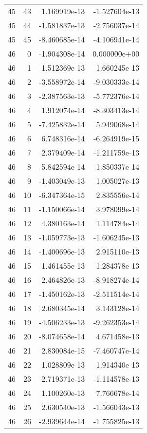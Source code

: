 \begin{tabular}{rrrr}
  45 &   43 &  1.169919e-13 & -1.527604e-13 \\
  45 &   44 & -1.581837e-13 & -2.756037e-14 \\
  45 &   45 & -8.460685e-14 & -4.106941e-14 \\
  46 &    0 & -1.904308e-14 &  0.000000e+00 \\
  46 &    1 &  1.512369e-13 &  1.660245e-13 \\
  46 &    2 & -3.558972e-14 & -9.030333e-14 \\
  46 &    3 & -2.387563e-13 & -5.772376e-14 \\
  46 &    4 &  1.912074e-14 & -8.303413e-14 \\
  46 &    5 & -7.425832e-14 &  5.949068e-14 \\
  46 &    6 &  6.748316e-14 & -6.264919e-15 \\
  46 &    7 &  2.379409e-14 & -1.211759e-13 \\
  46 &    8 &  5.842594e-14 &  1.850337e-14 \\
  46 &    9 & -1.403049e-13 &  1.005027e-13 \\
  46 &   10 & -6.347364e-15 &  2.835556e-14 \\
  46 &   11 & -1.150066e-14 &  3.978099e-14 \\
  46 &   12 &  4.380163e-14 &  1.114784e-14 \\
  46 &   13 & -1.059773e-13 & -1.606245e-13 \\
  46 &   14 & -1.400696e-13 &  2.915110e-13 \\
  46 &   15 &  1.461455e-13 &  1.284378e-13 \\
  46 &   16 &  2.464826e-13 & -8.918274e-14 \\
  46 &   17 & -1.450162e-13 & -2.511514e-14 \\
  46 &   18 &  2.680345e-14 &  3.143128e-14 \\
  46 &   19 & -4.506233e-13 & -9.262353e-14 \\
  46 &   20 & -8.074658e-14 &  4.671458e-13 \\
  46 &   21 &  2.830084e-15 & -7.460747e-14 \\
  46 &   22 &  1.028809e-13 &  1.914340e-13 \\
  46 &   23 &  2.719371e-13 & -1.114578e-13 \\
  46 &   24 &  1.100260e-13 &  7.766678e-14 \\
  46 &   25 &  2.630540e-13 & -1.566043e-13 \\
  46 &   26 & -2.939644e-14 & -1.755825e-13 \\

\end{tabular}
